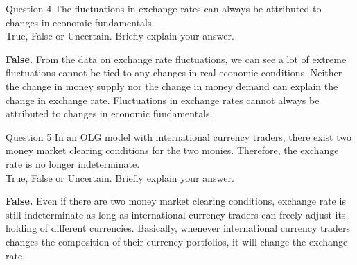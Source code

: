 \documentclass[a4paper]{article}
\newif\IfInSansMode
\numberwithin{equation}{section}
\numberwithin{figure}{section}
\begin{document}
	\begin{questionbox}{Question 4}
		The fluctuations in exchange rates can always be attributed to changes in economic fundamentals.\\
		True, False or Uncertain. Briefly explain your answer.
		\begin{explanationbox}
			\textbf{False.} From the data on exchange rate fluctuations, we can see a lot of extreme fluctuations cannot be tied to any changes in real economic conditions. Neither the change in money supply nor the change in money demand can explain the change in exchange rate. Fluctuations in exchange rates cannot always be attributed to changes in economic fundamentals.
		\end{explanationbox}
	\end{questionbox}
	\begin{questionbox}{Question 5}
		In an OLG model with international currency traders, there exist two money market clearing conditions for the two monies. Therefore, the exchange rate is no longer indeterminate.\\
		True, False or Uncertain. Briefly explain your answer.
		\begin{explanationbox}
			\textbf{False.} Even if there are two money market clearing conditions, exchange rate is still indeterminate as long as international currency traders can freely adjust its holding of different currencies. Basically, whenever international currency traders changes the composition of their currency portfolios, it will change the exchange rate.
		\end{explanationbox}
	\end{questionbox}
\end{document}
